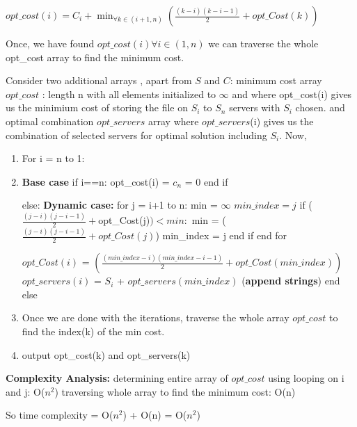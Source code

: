 \documentclass[11pt]{article}
\begin{document}
$opt\_cost(i) = C_i + \min_{\forall k \in (i+1,n)} (\frac{(k-i)(k-i-1)}{2} + opt\_Cost(k))$

Once, we have found $opt\_cost(i) \forall i \in (1,n)$ we can traverse the whole opt\_cost array to find the minimum cost.

 Consider two additional arrays , apart from $S$  and $C$: \newline
minimum cost array {\bf $opt\_cost$} : length n with all elements initialized to $\infty$ and where \newline
opt\_cost(i) gives us the minimium cost of storing the file on $S_i$ to $S_n$ servers with $S_i$ chosen. \newline
and optimal combination {\bf $opt\_servers$} array \newline 
where $opt\_servers$(i) gives us the combination of selected servers for optimal solution including $S_i$.
\newline
Now,
\begin{enumerate}
  \item For i = n to 1:

  \item {\bf Base case} \newline
  if i==n: opt\_cost(i) = $c_n$ = 0
  end if

else: {\bf Dynamic case:} \newline
	  for j = i+1 to n: \newline
		  min = $\infty$ \newline
		  $min\_index = j$ \newline
		  if ($\frac{(j-i)(j-i-1)}{2} + $opt\_Cost(j)$) < min:$ \newline
			  min = ($\frac{(j-i)(j-i-1)}{2} + opt\_Cost(j)$) \newline
			  min\_index = j  \newline
      end if \newline
    end for \newline

$opt\_Cost(i)$ = $(\frac{(min\_index-i)(min\_index-i-1)}{2} + opt\_Cost(min\_index))$ \newline
$opt\_servers(i)$ = $S_i$ + $opt\_servers(min\_index)$ ({\bf append strings}) \newline
end else

\item Once we are done with the iterations, traverse the whole array $opt\_cost$ to find the index(k) of the min cost.
\item output opt\_cost(k) and opt\_servers(k)
 \end{enumerate}

{\bf Complexity Analysis:} \newline
determining entire array of $opt\_cost$ using looping on i and j: O($n^2$) \newline
traversing whole array to find the minimum cost: O(n)

So time complexity = O($n^2$) + O(n) = O($n^2$)
\end{document}
